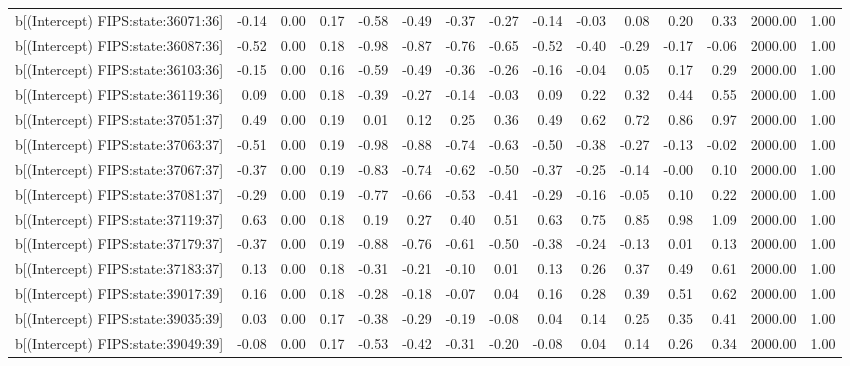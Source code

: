 \begin{table}[ht]
\begin{tabular}{rrrrrrrrrrrrrrr}
  b[(Intercept) FIPS:state:36071:36] & -0.14 & 0.00 & 0.17 & -0.58 & -0.49 & -0.37 & -0.27 & -0.14 & -0.03 & 0.08 & 0.20 & 0.33 & 2000.00 & 1.00 \\ 
  b[(Intercept) FIPS:state:36087:36] & -0.52 & 0.00 & 0.18 & -0.98 & -0.87 & -0.76 & -0.65 & -0.52 & -0.40 & -0.29 & -0.17 & -0.06 & 2000.00 & 1.00 \\ 
  b[(Intercept) FIPS:state:36103:36] & -0.15 & 0.00 & 0.16 & -0.59 & -0.49 & -0.36 & -0.26 & -0.16 & -0.04 & 0.05 & 0.17 & 0.29 & 2000.00 & 1.00 \\ 
  b[(Intercept) FIPS:state:36119:36] & 0.09 & 0.00 & 0.18 & -0.39 & -0.27 & -0.14 & -0.03 & 0.09 & 0.22 & 0.32 & 0.44 & 0.55 & 2000.00 & 1.00 \\ 
  b[(Intercept) FIPS:state:37051:37] & 0.49 & 0.00 & 0.19 & 0.01 & 0.12 & 0.25 & 0.36 & 0.49 & 0.62 & 0.72 & 0.86 & 0.97 & 2000.00 & 1.00 \\ 
  b[(Intercept) FIPS:state:37063:37] & -0.51 & 0.00 & 0.19 & -0.98 & -0.88 & -0.74 & -0.63 & -0.50 & -0.38 & -0.27 & -0.13 & -0.02 & 2000.00 & 1.00 \\ 
  b[(Intercept) FIPS:state:37067:37] & -0.37 & 0.00 & 0.19 & -0.83 & -0.74 & -0.62 & -0.50 & -0.37 & -0.25 & -0.14 & -0.00 & 0.10 & 2000.00 & 1.00 \\ 
  b[(Intercept) FIPS:state:37081:37] & -0.29 & 0.00 & 0.19 & -0.77 & -0.66 & -0.53 & -0.41 & -0.29 & -0.16 & -0.05 & 0.10 & 0.22 & 2000.00 & 1.00 \\ 
  b[(Intercept) FIPS:state:37119:37] & 0.63 & 0.00 & 0.18 & 0.19 & 0.27 & 0.40 & 0.51 & 0.63 & 0.75 & 0.85 & 0.98 & 1.09 & 2000.00 & 1.00 \\ 
  b[(Intercept) FIPS:state:37179:37] & -0.37 & 0.00 & 0.19 & -0.88 & -0.76 & -0.61 & -0.50 & -0.38 & -0.24 & -0.13 & 0.01 & 0.13 & 2000.00 & 1.00 \\ 
  b[(Intercept) FIPS:state:37183:37] & 0.13 & 0.00 & 0.18 & -0.31 & -0.21 & -0.10 & 0.01 & 0.13 & 0.26 & 0.37 & 0.49 & 0.61 & 2000.00 & 1.00 \\ 
  b[(Intercept) FIPS:state:39017:39] & 0.16 & 0.00 & 0.18 & -0.28 & -0.18 & -0.07 & 0.04 & 0.16 & 0.28 & 0.39 & 0.51 & 0.62 & 2000.00 & 1.00 \\ 
  b[(Intercept) FIPS:state:39035:39] & 0.03 & 0.00 & 0.17 & -0.38 & -0.29 & -0.19 & -0.08 & 0.04 & 0.14 & 0.25 & 0.35 & 0.41 & 2000.00 & 1.00 \\ 
  b[(Intercept) FIPS:state:39049:39] & -0.08 & 0.00 & 0.17 & -0.53 & -0.42 & -0.31 & -0.20 & -0.08 & 0.04 & 0.14 & 0.26 & 0.34 & 2000.00 & 1.00 \\ 

\end{tabular}
\end{table}
